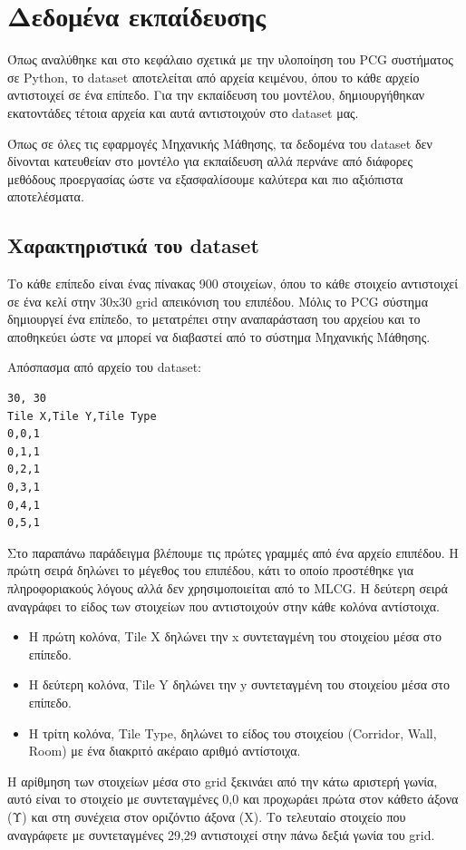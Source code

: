 \section{Δεδομένα εκπαίδευσης}
Όπως αναλύθηκε και στο κεφάλαιο σχετικά με την υλοποίηση του PCG συστήματος σε Python, το dataset αποτελείται από αρχεία κειμένου, όπου το κάθε αρχείο αντιστοιχεί σε ένα επίπεδο. Για την εκπαίδευση του μοντέλου, δημιουργήθηκαν εκατοντάδες τέτοια αρχεία και αυτά αντιστοιχούν στο dataset μας.
\par
Όπως σε όλες τις εφαρμογές Μηχανικής Μάθησης, τα δεδομένα του dataset δεν δίνονται κατευθείαν στο μοντέλο για εκπαίδευση αλλά περνάνε από διάφορες μεθόδους προεργασίας ώστε να εξασφαλίσουμε καλύτερα και πιο αξιόπιστα αποτελέσματα.


\subsection{Χαρακτηριστικά του dataset}
Το κάθε επίπεδο είναι ένας πίνακας 900 στοιχείων, όπου το κάθε στοιχείο αντιστοιχεί σε ένα κελί στην 30x30 grid απεικόνιση του επιπέδου. Μόλις το PCG σύστημα δημιουργεί ένα επίπεδο, το μετατρέπει στην αναπαράσταση του αρχείου και το αποθηκεύει ώστε να μπορεί να διαβαστεί από το σύστημα Μηχανικής Μάθησης.
\par
Απόσπασμα από αρχείο του dataset:
\begin{verbatim}
30, 30
Tile X,Tile Y,Tile Type
0,0,1
0,1,1
0,2,1
0,3,1
0,4,1
0,5,1
\end{verbatim}
Στο παραπάνω παράδειγμα βλέπουμε τις πρώτες γραμμές από ένα αρχείο επιπέδου. Η πρώτη σειρά δηλώνει το μέγεθος του επιπέδου, κάτι το οποίο προστέθηκε για πληροφοριακούς λόγους αλλά δεν χρησιμοποιείται από το MLCG. Η δεύτερη σειρά αναγράφει το είδος των στοιχείων που αντιστοιχούν στην κάθε κολόνα αντίστοιχα.
\par

\begin{itemize}
\item Η πρώτη κολόνα, Tile X δηλώνει την x συντεταγμένη του στοιχείου μέσα στο επίπεδο.
\item Η δεύτερη κολόνα, Tile Y δηλώνει την y συντεταγμένη του στοιχείου μέσα στο επίπεδο.
\item Η τρίτη κολόνα, Tile Type, δηλώνει το είδος του στοιχείου (Corridor, Wall, Room) με ένα διακριτό ακέραιο αριθμό αντίστοιχα.
\end{itemize}

\par
H αρίθμηση των στοιχείων μέσα στο grid ξεκινάει από την κάτω αριστερή γωνία, αυτό είναι το στοιχείο με συντεταγμένες 0,0 και προχωράει πρώτα στον κάθετο άξονα (Υ) και στη συνέχεια στον οριζόντιο άξονα (Χ). Το τελευταίο στοιχείο που αναγράφετε με συντεταγμένες 29,29 αντιστοιχεί στην πάνω δεξιά γωνία του grid.

